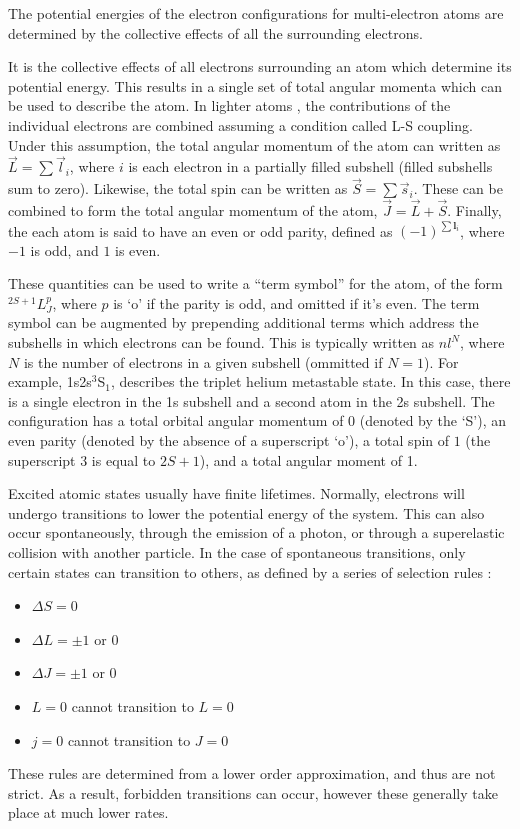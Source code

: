 The potential energies of the electron configurations for multi-electron atoms
are determined by the collective effects of all the surrounding electrons.

It is the collective effects of all electrons surrounding an atom which
determine its potential energy. This results in a single set of total angular
momenta which can be used to describe the atom. In lighter atoms
\cite{Drake2006}, the contributions of the individual electrons are combined
assuming a condition called L-S coupling. Under this assumption, the total
angular momentum of the atom can written as $\vec{L} = \sum\vec{l}_i$, where $i$
is each electron in a partially filled subshell (filled subshells sum to zero).
Likewise, the total spin can be written as $\vec{S} = \sum\vec{s}_i$. These can
be combined to form the total angular momentum of the atom, $\vec{J} = \vec{L} +
\vec{S}$. Finally, the each atom is said to have an even or odd parity, defined
as $(-1)^{\sum\bm{l}_i}$, where $-1$ is odd, and $1$ is even.

These quantities can be used to write a ``term symbol'' for the atom, of the
form $^{2S+1}L_J^p$, where $p$ is `o' if the parity is odd, and omitted if it's
even. The term symbol can be augmented by prepending additional terms which
address the subshells in which electrons can be found. This is typically written
as $nl^N$, where $N$ is the number of electrons in a given subshell (ommitted if
$N=1$). For example, 1s2s$^3$S$_{1}$, describes the triplet helium metastable
state. In this case, there is a single electron in the 1s subshell and a second
atom in the 2s subshell. The configuration has a total orbital angular momentum
of 0 (denoted by the `S'), an even parity (denoted by the absence of a
superscript `o'), a total spin of $1$ (the superscript $3$ is equal to $2S+1$),
and a total angular moment of 1.

Excited atomic states usually have finite lifetimes. Normally, electrons will
undergo transitions to lower the potential energy of the system. This can also
occur spontaneously, through the emission of a photon, or through a superelastic
collision with another particle. In the case of spontaneous transitions, only
certain states can transition to others, as defined by a series of selection
rules \cite{Drake2006}:
\begin{itemize}
  \item $\Delta S = 0$
  \item $\Delta L = \pm1$ or 0
  \item $\Delta J = \pm1$ or 0
  \item $L=0$ cannot transition to $L=0$
  \item $j=0$ cannot transition to $J=0$
\end{itemize}
These rules are determined from a lower order approximation, and thus are not
strict. As a result, forbidden transitions can occur, however these generally
take place at much lower rates.

